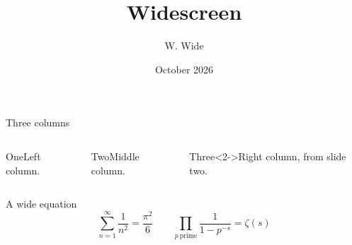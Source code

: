 \documentclass[aspectratio=169]{beamer}
\title{Widescreen}
\author{W. Wide}
\date{October 2026}
\begin{document}
\begin{frame}\titlepage\end{frame}
\begin{frame}{Three columns}
  \begin{columns}[onlytextwidth]
    \begin{block}{One}Left column.\end{block}
    \begin{block}{Two}Middle column.\end{block}
    \begin{block}{Three}<2->Right column, from slide two.\end{block}
  \end{columns}
\end{frame}
\begin{frame}{A wide equation}
  \[
    \sum_{n=1}^{\infty} \frac{1}{n^2} = \frac{\pi^2}{6}
    \qquad
    \prod_{p\ \mathrm{prime}} \frac{1}{1-p^{-s}} = \zeta(s)
  \]
\end{frame}
\end{document}
